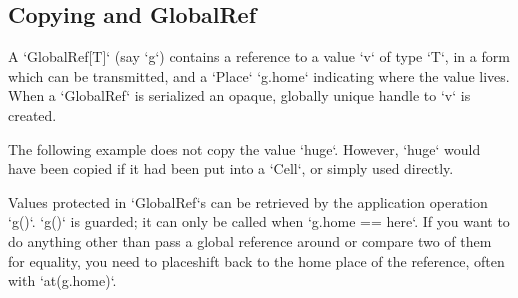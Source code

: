 \subsection{Copying and GlobalRef}
\label{GlobalRef}

A \xcd`GlobalRef[T]` (say \xcd`g`) contains a reference to
a value \xcd`v` of type \xcd`T`, in a form which can be transmitted, and a \xcd`Place`
\xcd`g.home` indicating where the value lives. When a 
\xcd`GlobalRef` is serialized an opaque, globally unique handle to
\xcd`v` is created.  

\begin{ex}The following example does not copy the value \xcd`huge`.  However, \xcd`huge`
would have been copied if it had been put into a \xcd`Cell`, or simply used
directly. 


% 
\begin{xten}
val huge = "A potentially big thing";
val href = GlobalRef(huge);
at (here) {
   use(href);
  }
}
\end{xten}


\end{ex}

Values protected in \xcd`GlobalRef`s can be retrieved by the application
operation \xcd`g()`.  \xcd`g()` is guarded; it can 
only be called when \xcd`g.home == here`.  If you  want to do anything other
than pass a global reference around or compare two of them for equality, you
need to placeshift back to the home place of the reference, often with
\xcd`at(g.home)`.   

